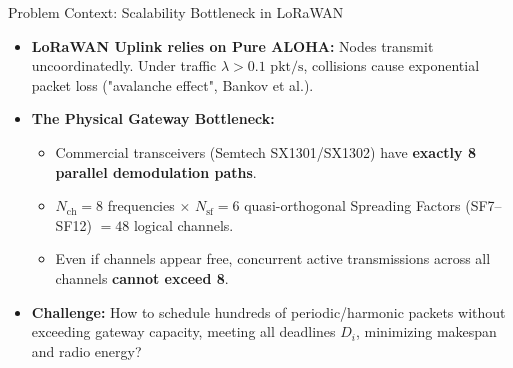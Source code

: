\documentclass[aspectratio=169,10pt]{beamer}
\begin{document}
\begin{frame}{Problem Context: Scalability Bottleneck in LoRaWAN}
  \begin{itemize}
    \item \textbf{LoRaWAN Uplink relies on Pure ALOHA:} Nodes transmit uncoordinatedly. Under traffic $\lambda > 0.1\text{ pkt/s}$, collisions cause exponential packet loss ("avalanche effect", Bankov et al.).
    \item \textbf{The Physical Gateway Bottleneck:}
    \begin{itemize}
      \item Commercial transceivers (Semtech SX1301/SX1302) have \textbf{exactly 8 parallel demodulation paths}.
      \item $N_{\text{ch}} = 8$ frequencies $\times$ $N_{\text{sf}} = 6$ quasi-orthogonal Spreading Factors (SF7--SF12) $= 48$ logical channels.
      \item Even if channels appear free, concurrent active transmissions across all channels \textbf{cannot exceed 8}.
    \end{itemize}
    \item \textbf{Challenge:} How to schedule hundreds of periodic/harmonic packets without exceeding gateway capacity, meeting all deadlines $D_i$, minimizing makespan and radio energy?
  \end{itemize}
\end{frame}
\end{document}
